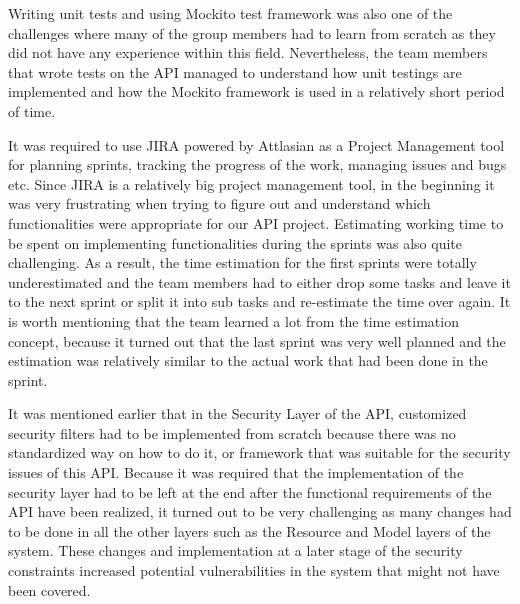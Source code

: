 Writing unit tests and using Mockito \cite{mockitoRef} test framework was also one of the challenges where many of the group members had to learn from scratch as they did not have any experience within this field. Nevertheless, the team members that wrote tests on the API managed to understand how unit testings are implemented and how the Mockito framework is used in a relatively short period of time.

It was required to use JIRA powered by Attlasian as a Project Management tool for planning sprints, tracking the progress of the work, managing issues and bugs etc. Since JIRA is a relatively big project management tool, in the beginning it was very frustrating when trying to figure out and understand which functionalities were appropriate for our API project. Estimating working time to be spent on implementing functionalities during the sprints was also quite challenging. As a result, the time estimation for the first sprints were totally underestimated and the team members had to either drop some tasks and leave it to the next sprint or split it into sub tasks and re-estimate the time over again. It is worth mentioning that the team learned a lot from the time estimation concept, because it turned out that the last sprint was very well planned and the estimation was relatively similar to the actual work that had been done in the sprint.

It was mentioned earlier that in the Security Layer of the API, customized security filters had to be implemented from scratch because there was no standardized way on how to do it, or framework that was suitable for the security issues of this API. Because it was required that the implementation of the security layer had to be left at the end after the functional requirements of the API have been realized, it turned out to be very challenging as many changes had to be done in all the other layers such as the Resource and Model layers of the system. These changes and implementation at a later stage of the security constraints increased potential vulnerabilities in the system that might not have been covered.


